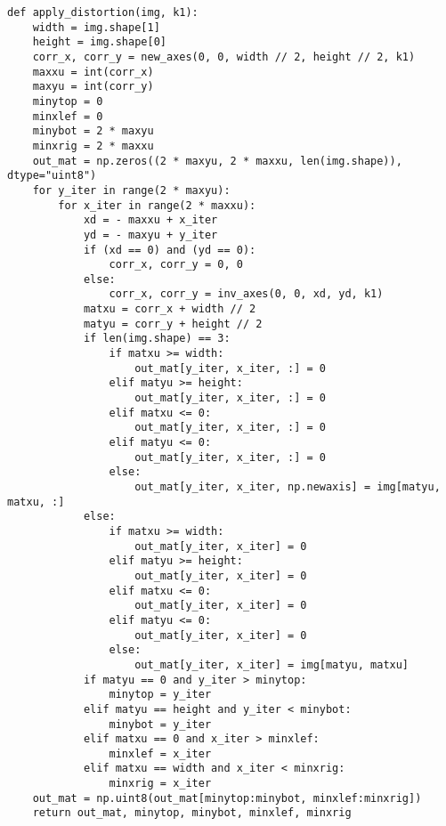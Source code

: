 \documentclass[12pt, onecolumn]{article}
\newcommand\normf{\fangsong}
\begin{document}
	\begin{lstlisting}[caption={\normf 基于标定结果进行图像去畸变}]
def apply_distortion(img, k1):
    width = img.shape[1]
    height = img.shape[0]
    corr_x, corr_y = new_axes(0, 0, width // 2, height // 2, k1)
    maxxu = int(corr_x)
    maxyu = int(corr_y)
    minytop = 0
    minxlef = 0
    minybot = 2 * maxyu
    minxrig = 2 * maxxu
    out_mat = np.zeros((2 * maxyu, 2 * maxxu, len(img.shape)), dtype="uint8")
    for y_iter in range(2 * maxyu):
        for x_iter in range(2 * maxxu):
            xd = - maxxu + x_iter
            yd = - maxyu + y_iter
            if (xd == 0) and (yd == 0):
                corr_x, corr_y = 0, 0
            else:
                corr_x, corr_y = inv_axes(0, 0, xd, yd, k1)
            matxu = corr_x + width // 2
            matyu = corr_y + height // 2
            if len(img.shape) == 3:
                if matxu >= width:
                    out_mat[y_iter, x_iter, :] = 0
                elif matyu >= height:
                    out_mat[y_iter, x_iter, :] = 0
                elif matxu <= 0:
                    out_mat[y_iter, x_iter, :] = 0
                elif matyu <= 0:
                    out_mat[y_iter, x_iter, :] = 0
                else:
                    out_mat[y_iter, x_iter, np.newaxis] = img[matyu, matxu, :]
            else:
                if matxu >= width:
                    out_mat[y_iter, x_iter] = 0
                elif matyu >= height:
                    out_mat[y_iter, x_iter] = 0
                elif matxu <= 0:
                    out_mat[y_iter, x_iter] = 0
                elif matyu <= 0:
                    out_mat[y_iter, x_iter] = 0
                else:
                    out_mat[y_iter, x_iter] = img[matyu, matxu]
            if matyu == 0 and y_iter > minytop:
                minytop = y_iter
            elif matyu == height and y_iter < minybot:
                minybot = y_iter
            elif matxu == 0 and x_iter > minxlef:
                minxlef = x_iter
            elif matxu == width and x_iter < minxrig:
                minxrig = x_iter
    out_mat = np.uint8(out_mat[minytop:minybot, minxlef:minxrig])
    return out_mat, minytop, minybot, minxlef, minxrig
	\end{lstlisting}

	\newpage
	
	
		
	\newpage
\end{document}
